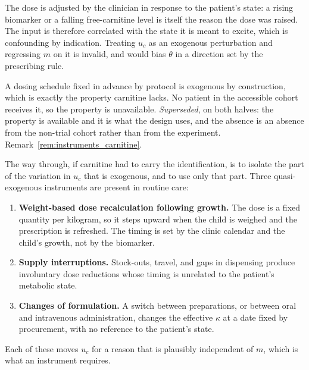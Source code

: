 \begin{description}[leftmargin=1.4em, itemsep=3pt]
\item[Carnitine is available but endogenous.] The dose is adjusted by the clinician in
response to the patient's state: a rising biomarker or a falling free-carnitine level is
itself the reason the dose was raised. The input is therefore correlated with the state it
is meant to excite, which is confounding by indication. Treating $u_c$ as an exogenous
perturbation and regressing $m$ on it is invalid, and would bias $\theta$ in a direction
set by the prescribing rule.
\item[The therapy would be exogenous but is absent.] A dosing schedule fixed in advance by
protocol is exogenous by construction, which is exactly the property carnitine lacks. No
patient in the accessible cohort receives it, so the property is unavailable.
\emph{Superseded}, on both halves: the property is available and it is what the design
uses, and the absence is an absence from the non-trial cohort rather than from the
experiment. Remark~\ref{rem:instruments_carnitine}.
\end{description}

The way through, if carnitine had to carry the identification, is to isolate the part of
the variation in $u_c$ that is exogenous, and to use only that part. Three quasi-exogenous
instruments are present in routine care:

\begin{enumerate}[leftmargin=*, itemsep=2pt]
\item \textbf{Weight-based dose recalculation following growth.} The dose is a fixed
      quantity per kilogram, so it steps upward when the child is weighed and the
      prescription is refreshed. The timing is set by the clinic calendar and the child's
      growth, not by the biomarker.
\item \textbf{Supply interruptions.} Stock-outs, travel, and gaps in dispensing produce
      involuntary dose reductions whose timing is unrelated to the patient's metabolic
      state.
\item \textbf{Changes of formulation.} A switch between preparations, or between oral and
      intravenous administration, changes the effective $\kappa$ at a date fixed by
      procurement, with no reference to the patient's state.
\end{enumerate}

Each of these moves $u_c$ for a reason that is plausibly independent of $m$, which is what
an instrument requires.

